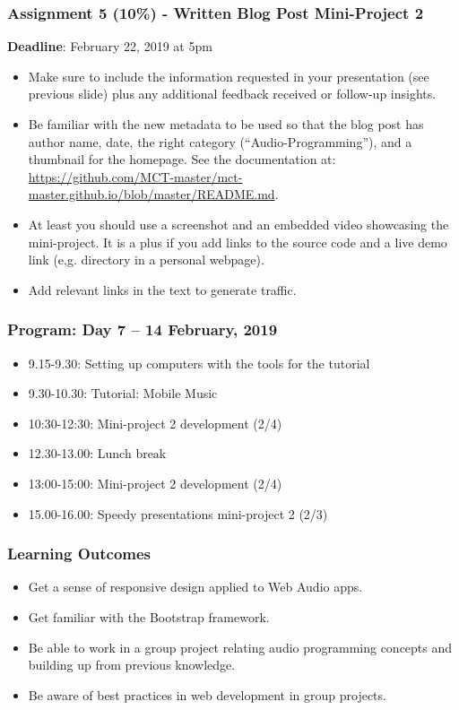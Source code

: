 \documentclass[screen, aspectratio=43]{beamer}
\begin{document}
%
\begin{frame}
\frametitle{Assignment 5 (10\%) - Written Blog Post Mini-Project 2}
\textbf{Deadline}: February 22, 2019 at 5pm
\begin{itemize}
\item Make sure to include the information requested in your presentation (see previous slide) plus any additional feedback received or follow-up insights.
\item Be familiar with the new metadata to be used so that the blog post has author name, date, the right category (``Audio-Programming''), and a thumbnail for the homepage. See the documentation at: \url{https://github.com/MCT-master/mct-master.github.io/blob/master/README.md}.
\item At least you should use a screenshot and an embedded video showcasing the mini-project. It is a plus if you add links to the source code and a live demo link (e,g. directory in a personal webpage).
\item Add relevant links in the text to generate traffic.
\end{itemize}
\end{frame}
%
\begin{frame}
\frametitle{Program: Day 7 -- 14 February, 2019}
\begin{itemize}
\item 9.15-9.30: Setting up computers with the tools for the tutorial
\item 9.30-10.30: Tutorial: Mobile Music
\item 10:30-12:30: Mini-project 2 development (2/4)
\item 12.30-13.00: Lunch break
\item 13:00-15:00: Mini-project 2 development (2/4)
\item 15.00-16.00: Speedy presentations mini-project 2 (2/3)
\end{itemize}
\end{frame}
%
\begin{frame}
\frametitle{Learning Outcomes}
\begin{itemize}
\item Get a sense of responsive design applied to Web Audio apps.
\item Get familiar with the Bootstrap framework.
\item Be able to work in a group project relating audio programming concepts and building up from previous knowledge.
\item Be aware of best practices in web development in group projects.
\end{itemize}
\end{frame}
\end{document}
